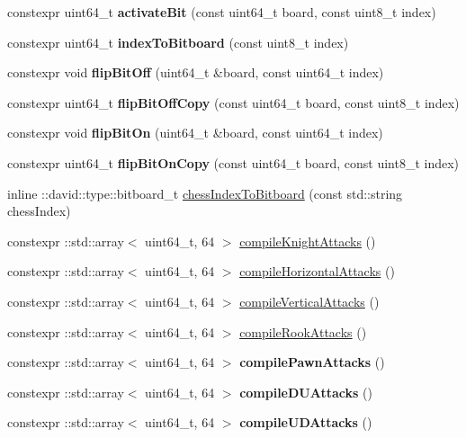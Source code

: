 \begin{DoxyCompactItemize}
constexpr uint64\+\_\+t {\bfseries activate\+Bit} (const uint64\+\_\+t board, const uint8\+\_\+t index)
\item 
\mbox{\label{namespaceutils_a24a4a106ffb9297f514ab2545e7686f8}} 
constexpr uint64\+\_\+t {\bfseries index\+To\+Bitboard} (const uint8\+\_\+t index)
\item 
\mbox{\label{namespaceutils_a0dcbfb05d37538860f8c6952b797a087}} 
constexpr void {\bfseries flip\+Bit\+Off} (uint64\+\_\+t \&board, const uint64\+\_\+t index)
\item 
\mbox{\label{namespaceutils_a26ec640084d33d347c2dcb20c1e51b87}} 
constexpr uint64\+\_\+t {\bfseries flip\+Bit\+Off\+Copy} (const uint64\+\_\+t board, const uint8\+\_\+t index)
\item 
\mbox{\label{namespaceutils_aa175d82e1ca3a1de0cf90d322ff6121e}} 
constexpr void {\bfseries flip\+Bit\+On} (uint64\+\_\+t \&board, const uint64\+\_\+t index)
\item 
\mbox{\label{namespaceutils_ae85f5665776c06009edf09d7806cfe31}} 
constexpr uint64\+\_\+t {\bfseries flip\+Bit\+On\+Copy} (const uint64\+\_\+t board, const uint8\+\_\+t index)
\item 
inline \+::david\+::type\+::bitboard\+\_\+t \hyperlink{namespaceutils_a0636557b5feb605e766d4d475bf2aa06}{chess\+Index\+To\+Bitboard} (const std\+::string chess\+Index)
\item 
constexpr \+::std\+::array$<$ uint64\+\_\+t, 64 $>$ \hyperlink{namespaceutils_a044acdfcbacf70cc1a638f54b0383546}{compile\+Knight\+Attacks} ()
\item 
constexpr \+::std\+::array$<$ uint64\+\_\+t, 64 $>$ \hyperlink{namespaceutils_abcc2ec379cf8441898e1446ae0ca6fb5}{compile\+Horizontal\+Attacks} ()
\item 
constexpr \+::std\+::array$<$ uint64\+\_\+t, 64 $>$ \hyperlink{namespaceutils_ab4db5d05b597a157948bf348fc6184ad}{compile\+Vertical\+Attacks} ()
\item 
constexpr \+::std\+::array$<$ uint64\+\_\+t, 64 $>$ \hyperlink{namespaceutils_a43e54c4f225236daf6809e0e877cfeaf}{compile\+Rook\+Attacks} ()
\item 
\mbox{\label{namespaceutils_aa9057308aa2ffb27cf07a4d92a5bf160}} 
constexpr \+::std\+::array$<$ uint64\+\_\+t, 64 $>$ {\bfseries compile\+Pawn\+Attacks} ()
\item 
\mbox{\label{namespaceutils_a9c81cd4fda78936341a550831291c4e8}} 
constexpr \+::std\+::array$<$ uint64\+\_\+t, 64 $>$ {\bfseries compile\+D\+U\+Attacks} ()
\item 
\mbox{\label{namespaceutils_a83c8269af203f5850f56f1085d692fc3}} 
constexpr \+::std\+::array$<$ uint64\+\_\+t, 64 $>$ {\bfseries compile\+U\+D\+Attacks} ()
\end{DoxyCompactItemize}


